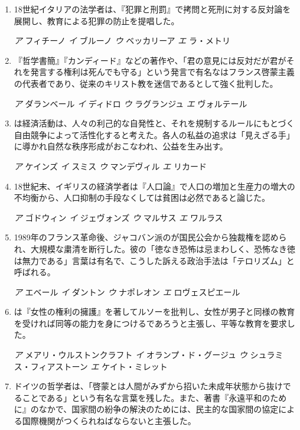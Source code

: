 \documentclass[uplatex,dvipdfmx]{jsarticle}
\newcommand{\sentakusi}[4]{
\hspace{.3zw}
\emph{ア}\hspace{1zw} #1 \hspace{2zw} \emph{イ} \hspace{1zw}#2 \hspace{2zw}\emph{ウ}\hspace{1zw} #3 \hspace{2zw}\emph{エ}\hspace{1zw} #4

}
\begin{document}
\begin{enumerate}
\sentakusi
{クェーカー}
{バプティスト}
{ピューリタン}
{メソジスト}


\item   18世紀イタリアの法学者は、『犯罪と刑罰』で拷問と死刑に対する反対論を展開し、教育による犯罪の防止を提唱した。

\sentakusi
{フィチーノ}
{ブルーノ}
{ベッカリーア}
{ラ・メトリ}

\item   『哲学書簡』『カンディード』などの著作や、「君の意見には反対だが君がそれを発言する権利は死んでも守る」という発言で有名なはフランス啓蒙主義の代表者であり、従来のキリスト教を迷信であるとして強く批判した。

\sentakusi
{ダランベール}
{ディドロ}
{ラグランジュ}
{ヴォルテール}


\item   {}は経済活動は、人々の利己的な自発性と、それを規制するルールにもとづく自由競争によって活性化すると考えた。各人の私益の追求は「見えざる手」に導かれ自然な秩序形成がおこなわれ、公益を生み出す。

\sentakusi
{ケインズ}
{スミス}
{マンデヴィル}
{リカード}

\item   18世紀末、イギリスの経済学者は『人口論』で人口の増加と生産力の増大の不均衡から、人口抑制の手段なくしては貧困は必然であると論じた。

\sentakusi
{ゴドウィン}
{ジェヴォンズ}
{マルサス}
{ワルラス}

\item 1989年のフランス革命後、ジャコバン派のが国民公会から独裁権を認められ、大規模な粛清を断行した。彼の「徳なき恐怖は忌まわしく、恐怖なき徳は無力である」言葉は有名で、こうした訴える政治手法は「テロリズム」と呼ばれる。

\sentakusi
{エベール}
{ダントン}
{ナポレオン}
{ロヴェスピエール}


\item   {}は『女性の権利の擁護』を著してルソーを批判し、女性が男子と同様の教育を受ければ同等の能力を身につけるであろうと主張し、平等な教育を要求した。

\sentakusi
{メアリ・ウルストンクラフト}
{オランプ・ド・グージュ}
{シュラミス・フィアストーン}
{ケイト・ミレット}

\item   ドイツの哲学者は、「啓蒙とは人間がみずから招いた未成年状態から抜けでることである」という有名な言葉を残した。また、著書『永遠平和のために』のなかで、国家間の紛争の解決のためには、民主的な国家間の協定による国際機関がつくられねばならないと主張した。


\end{enumerate}
\end{document}
